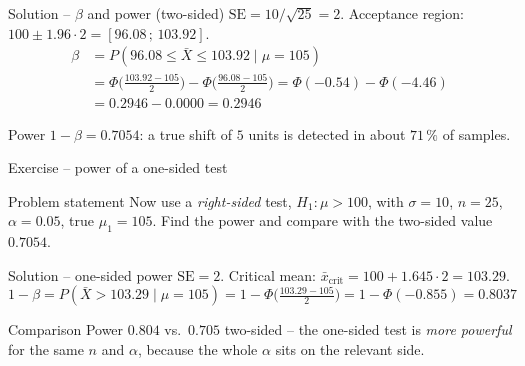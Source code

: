 \documentclass[aspectratio=169,11pt]{beamer}
\begin{document}
\begin{frame}{Solution -- $\beta$ and power (two-sided)}
  $\text{SE} = 10/\sqrt{25} = 2$. Acceptance region:
  $100 \pm 1.96\cdot 2 = [96.08\,;\,103.92]$.
  \begin{align*}
    \beta &= P(96.08 \le \bar X \le 103.92 \mid \mu = 105)\\
          &= \Phi\!\Big(\tfrac{103.92-105}{2}\Big)
             - \Phi\!\Big(\tfrac{96.08-105}{2}\Big)
           = \Phi(-0.54) - \Phi(-4.46)\\
          &= 0.2946 - 0.0000 = \mathbf{0.2946}
  \end{align*}
  \begin{exampleblock}{Power}
    $1-\beta = \mathbf{0.7054}$: a true shift of $5$ units is detected in about
    $71\,\%$ of samples.
  \end{exampleblock}
\end{frame}

\begin{frame}{Exercise -- power of a one-sided test}
  \begin{block}{Problem statement}
    Now use a \emph{right-sided} test, $H_1:\mu>100$, with $\sigma=10$,
    $n=25$, $\alpha=0.05$, true $\mu_1=105$. Find the power and compare with
    the two-sided value $0.7054$.
  \end{block}
\end{frame}

\begin{frame}{Solution -- one-sided power}
  $\text{SE}=2$. Critical mean:
  $\bar x_{\text{crit}} = 100 + 1.645\cdot 2 = 103.29$.
  \[
    1-\beta = P(\bar X > 103.29 \mid \mu=105)
            = 1-\Phi\!\Big(\tfrac{103.29-105}{2}\Big)
            = 1-\Phi(-0.855) = \mathbf{0.8037}
  \]
  \begin{exampleblock}{Comparison}
    Power $0.804$ vs.\ $0.705$ two-sided -- the one-sided test is \emph{more
    powerful} for the same $n$ and $\alpha$, because the whole $\alpha$ sits on
    the relevant side.
  \end{exampleblock}
\end{frame}
\end{document}
